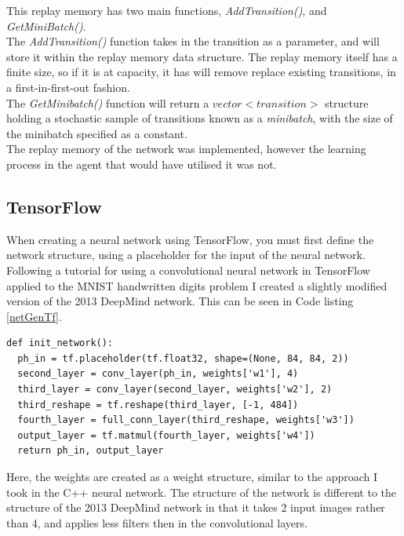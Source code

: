 \documentclass[10pt]{article}
\begin{document}
		This replay memory has two main functions, \textit{AddTransition()}, and \textit{GetMiniBatch()}.\\
		
		The \textit{AddTransition()} function takes in the transition as a parameter, and will store it within the replay memory data structure. The replay memory itself has a finite size, so if it is at capacity, it has will remove replace existing transitions, in a first-in-first-out fashion.\\
		
		The \textit{GetMinibatch()} function will return a $vector<transition>$ structure holding a stochastic sample of transitions known as a \textit{minibatch}, with the size of the minibatch specified as a constant.\\
		
		The replay memory of the network was implemented, however the learning process in the agent that would have utilised it was not.
	\medskip	
	
	\subsection{TensorFlow}
		When creating a neural network using TensorFlow, you must first define the network structure, using a placeholder for the input of the neural network. Following a tutorial for using a convolutional neural network in TensorFlow applied to the MNIST handwritten digits problem \cite{tfTut} I created a slightly modified version of the 2013 DeepMind network. This can be seen in Code listing \ref{netGenTf}.
						\renewcommand{\lstlistingname}{Code Listing}
		\begin{lstlisting}[caption={Network generation in TensorFlow},label={netGenTf}]	
def init_network():
  ph_in = tf.placeholder(tf.float32, shape=(None, 84, 84, 2))
  second_layer = conv_layer(ph_in, weights['w1'], 4)
  third_layer = conv_layer(second_layer, weights['w2'], 2)
  third_reshape = tf.reshape(third_layer, [-1, 484])
  fourth_layer = full_conn_layer(third_reshape, weights['w3'])
  output_layer = tf.matmul(fourth_layer, weights['w4'])
  return ph_in, output_layer
		\end{lstlisting}
		
		Here, the weights are created as a weight structure, similar to the approach I took in the C++ neural network. The structure of the network is different to the structure of the 2013 DeepMind network in that it takes 2 input images rather than 4, and applies less filters then in the convolutional layers.\\
		
\end{document}
